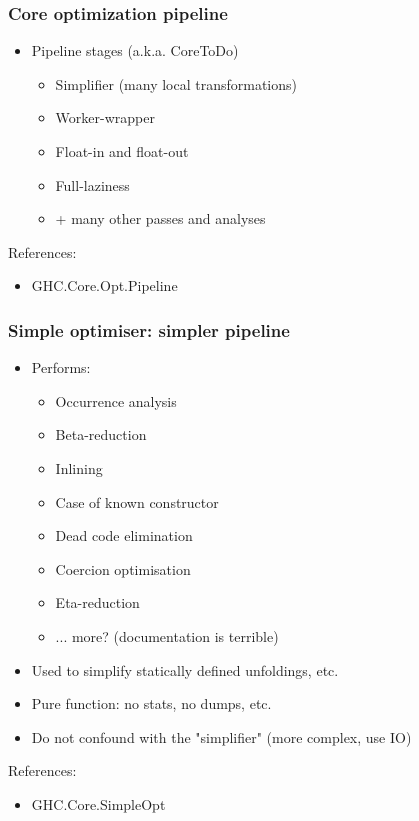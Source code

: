 \documentclass[aspectratio=169]{beamer}
\begin{document}
\begin{frame}
  \frametitle{Core optimization pipeline}
  \begin{itemize}
    \item Pipeline stages (a.k.a. CoreToDo)
      \begin{itemize}
        \item Simplifier (many local transformations)
        \item Worker-wrapper
        \item Float-in and float-out
        \item Full-laziness
        \item + many other passes and analyses
      \end{itemize}
  \end{itemize}

  References:
  \begin{itemize}
    \item GHC.Core.Opt.Pipeline
  \end{itemize}
\end{frame}

\begin{frame}
  \frametitle{Simple optimiser: simpler pipeline}

  \begin{itemize}
    \item Performs:
      \begin{itemize}
        \item Occurrence analysis
        \item Beta-reduction
        \item Inlining
        \item Case of known constructor
        \item Dead code elimination
        \item Coercion optimisation
        \item Eta-reduction
        \item ... more? (documentation is terrible)
      \end{itemize}
    \item Used to simplify statically defined unfoldings, etc.
    \item Pure function: no stats, no dumps, etc.
    \item Do not confound with the "simplifier" (more complex, use IO)
  \end{itemize}

  References:
  \begin{itemize}
    \item GHC.Core.SimpleOpt
  \end{itemize}
\end{frame}
\end{document}
